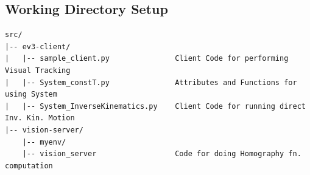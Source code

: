 \documentclass[11pt]{article}
\begin{document}
\subsection{Working Directory Setup}
\begin{verbatim}
src/
|-- ev3-client/                         
|   |-- sample_client.py               Client Code for performing Visual Tracking
|   |-- System_constT.py               Attributes and Functions for using System
|   |-- System_InverseKinematics.py    Client Code for running direct Inv. Kin. Motion
|-- vision-server/
    |-- myenv/
    |-- vision_server                  Code for doing Homography fn. computation
\end{verbatim}
\end{document}
